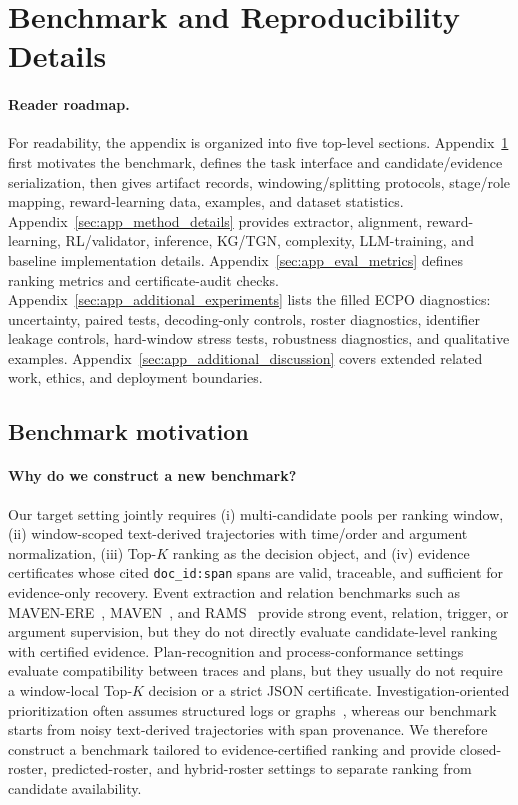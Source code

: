 \documentclass{article}
\begin{document}
\appendix

\section{Benchmark and Reproducibility Details}
\label{sec:app_benchmark_reproducibility}

\paragraph{Reader roadmap.}
For readability, the appendix is organized into five top-level sections.
Appendix~\ref{sec:app_benchmark_reproducibility} first motivates the benchmark, defines the task interface and candidate/evidence serialization, then gives artifact records, windowing/splitting protocols, stage/role mapping, reward-learning data, examples, and dataset statistics.
Appendix~\ref{sec:app_method_details} provides extractor, alignment, reward-learning, RL/validator, inference, KG/TGN, complexity, LLM-training, and baseline implementation details.
Appendix~\ref{sec:app_eval_metrics} defines ranking metrics and certificate-audit checks.
Appendix~\ref{sec:app_additional_experiments} lists the filled ECPO diagnostics: uncertainty, paired tests, decoding-only controls, roster diagnostics, identifier leakage controls, hard-window stress tests, robustness diagnostics, and qualitative examples.
Appendix~\ref{sec:app_additional_discussion} covers extended related work, ethics, and deployment boundaries.

\subsection{Benchmark motivation}
\label{sec:app_moved_dataset_motivation}

\paragraph{Why do we construct a new benchmark?}
Our target setting jointly requires (i) multi-candidate pools per ranking window, (ii) window-scoped text-derived trajectories with time/order and argument normalization, (iii) Top-$K$ ranking as the decision object, and (iv) evidence certificates whose cited \texttt{doc\_id:span} spans are valid, traceable, and sufficient for evidence-only recovery. Event extraction and relation benchmarks such as MAVEN-ERE~\citep{wang_maven-ere_2022}, MAVEN~\citep{wang_maven_2020}, and RAMS~\citep{ebner_multi-sentence_2020} provide strong event, relation, trigger, or argument supervision, but they do not directly evaluate candidate-level ranking with certified evidence. Plan-recognition and process-conformance settings evaluate compatibility between traces and plans, but they usually do not require a window-local Top-$K$ decision or a strict JSON certificate. Investigation-oriented prioritization often assumes structured logs or graphs~\citep{sutmuller_getting_2020,hung_investigative_2016}, whereas our benchmark starts from noisy text-derived trajectories with span provenance. We therefore construct a benchmark tailored to evidence-certified ranking and provide closed-roster, predicted-roster, and hybrid-roster settings to separate ranking from candidate availability.
\end{document}
